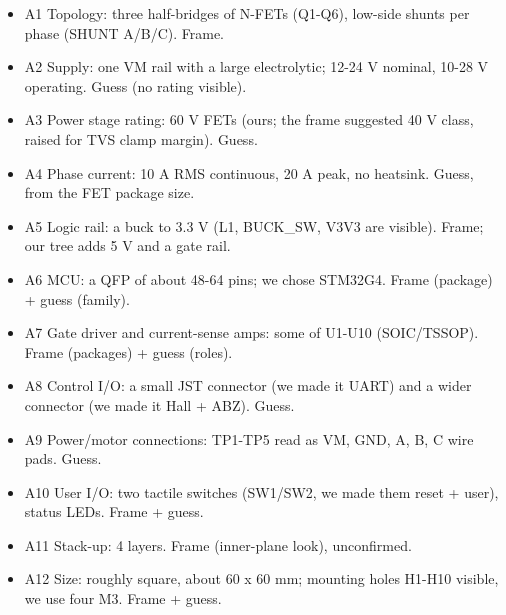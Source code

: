\documentclass[11pt,a4paper]{article}
\begin{document}
\begin{itemize}
\item A1 Topology: three half-bridges of N-FETs (Q1-Q6), low-side shunts per phase (SHUNT A/B/C). Frame.
\item A2 Supply: one VM rail with a large electrolytic; 12-24 V nominal, 10-28 V operating. Guess (no rating visible).
\item A3 Power stage rating: 60 V FETs (ours; the frame suggested 40 V class, raised for TVS clamp margin). Guess.
\item A4 Phase current: 10 A RMS continuous, 20 A peak, no heatsink. Guess, from the FET package size.
\item A5 Logic rail: a buck to 3.3 V (L1, BUCK\_SW, V3V3 are visible). Frame; our tree adds 5 V and a gate rail.
\item A6 MCU: a QFP of about 48-64 pins; we chose STM32G4. Frame (package) + guess (family).
\item A7 Gate driver and current-sense amps: some of U1-U10 (SOIC/TSSOP). Frame (packages) + guess (roles).
\item A8 Control I/O: a small JST connector (we made it UART) and a wider connector (we made it Hall + ABZ). Guess.
\item A9 Power/motor connections: TP1-TP5 read as VM, GND, A, B, C wire pads. Guess.
\item A10 User I/O: two tactile switches (SW1/SW2, we made them reset + user), status LEDs. Frame + guess.
\item A11 Stack-up: 4 layers. Frame (inner-plane look), unconfirmed.
\item A12 Size: roughly square, about 60 x 60 mm; mounting holes H1-H10 visible, we use four M3. Frame + guess.
\end{itemize}
\end{document}

